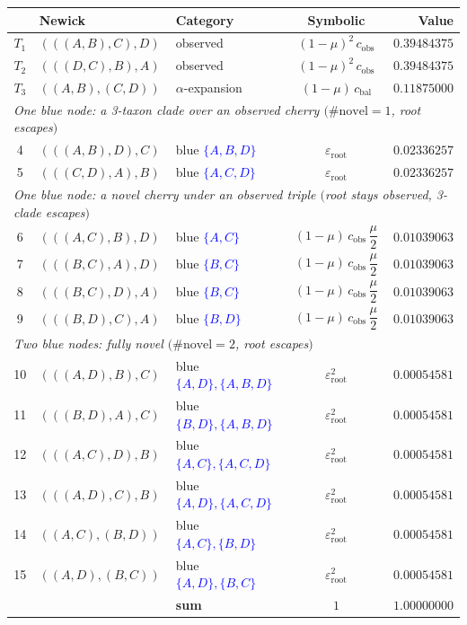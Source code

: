 \documentclass[11pt]{article}
\newcommand{\blue}[1]{\textcolor{blue}{#1}}
\newcommand{\cobs}{c_{\mathrm{obs}}}
\newcommand{\cbal}{c_{\mathrm{bal}}}
\newcommand{\eroot}{\varepsilon_{\mathrm{root}}}
\begin{document}
\begin{center}
\renewcommand{\arraystretch}{1.35}
\begin{tabular}{c l l c r}
\toprule
 & \textbf{Newick} & \textbf{Category} & \textbf{Symbolic} & \textbf{Value} \\
\midrule
$T_1$ & $(((A,B),C),D)$ & observed            & $(1-\mu)^2\,\cobs$ & $0.39484375$ \\
$T_2$ & $(((D,C),B),A)$ & observed            & $(1-\mu)^2\,\cobs$ & $0.39484375$ \\
$T_3$ & $((A,B),(C,D))$ & $\alpha$-expansion  & $(1-\mu)\,\cbal$   & $0.11875000$ \\
\midrule
\multicolumn{5}{l}{\emph{One blue node: a 3-taxon clade over an observed cherry $(\#\text{novel}=1$, root escapes$)$}}\\
4 & $(((A,B),D),C)$ & blue \blue{$\{A,B,D\}$} & $\eroot$ & $0.02336257$ \\
5 & $(((C,D),A),B)$ & blue \blue{$\{A,C,D\}$} & $\eroot$ & $0.02336257$ \\
\midrule
\multicolumn{5}{l}{\emph{One blue node: a novel cherry under an observed triple $($root stays observed, 3-clade escapes$)$}}\\
6 & $(((A,C),B),D)$ & blue \blue{$\{A,C\}$} & $(1-\mu)\,\cobs\,\dfrac{\mu}{2}$ & $0.01039063$ \\
7 & $(((B,C),A),D)$ & blue \blue{$\{B,C\}$} & $(1-\mu)\,\cobs\,\dfrac{\mu}{2}$ & $0.01039063$ \\
8 & $(((B,C),D),A)$ & blue \blue{$\{B,C\}$} & $(1-\mu)\,\cobs\,\dfrac{\mu}{2}$ & $0.01039063$ \\
9 & $(((B,D),C),A)$ & blue \blue{$\{B,D\}$} & $(1-\mu)\,\cobs\,\dfrac{\mu}{2}$ & $0.01039063$ \\
\midrule
\multicolumn{5}{l}{\emph{Two blue nodes: fully novel $(\#\text{novel}=2$, root escapes$)$}}\\
10 & $(((A,D),B),C)$ & blue \blue{$\{A,D\},\{A,B,D\}$} & $\eroot^2$ & $0.00054581$ \\
11 & $(((B,D),A),C)$ & blue \blue{$\{B,D\},\{A,B,D\}$} & $\eroot^2$ & $0.00054581$ \\
12 & $(((A,C),D),B)$ & blue \blue{$\{A,C\},\{A,C,D\}$} & $\eroot^2$ & $0.00054581$ \\
13 & $(((A,D),C),B)$ & blue \blue{$\{A,D\},\{A,C,D\}$} & $\eroot^2$ & $0.00054581$ \\
14 & $((A,C),(B,D))$ & blue \blue{$\{A,C\},\{B,D\}$}   & $\eroot^2$ & $0.00054581$ \\
15 & $((A,D),(B,C))$ & blue \blue{$\{A,D\},\{B,C\}$}   & $\eroot^2$ & $0.00054581$ \\
\midrule
   &                 & \textbf{sum}                   & $1$ & $1.00000000$ \\
\bottomrule
\end{tabular}
\end{center}
\end{document}
